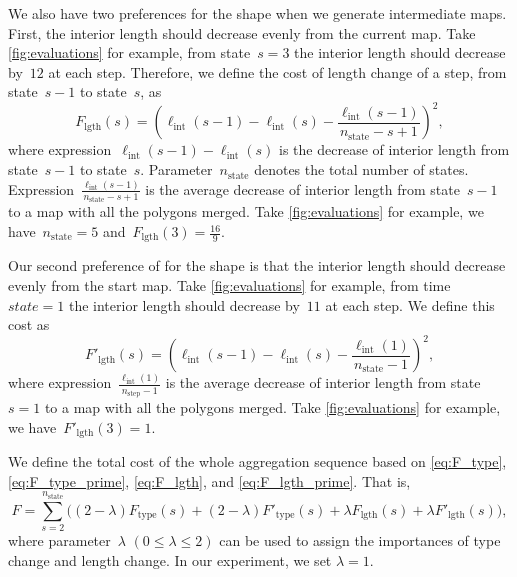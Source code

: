 \documentclass[ijgi,article,submit,moreauthors,pdftex]{Definitions/mdpi}
\begin{document}
We also have two preferences for the shape when we generate intermediate maps.
First, the interior length should decrease evenly from the current map.
Take \fig\ref{fig:evaluations} for example, 
from state~$s=3$ the interior length should decrease by~$12$ at each step.
Therefore, we define the cost of length change of a step,
from state~$s-1$ to state~$s$, as
\begin{equation}
\label{eq:F_lgth}
F_\mathrm{lgth}(s)=
    \left(\ell_\mathrm{int}(s-1)-\ell_\mathrm{int}(s)-
        \frac{\ell_\mathrm{int}(s-1)}{n_\mathrm{state}-s+1}\right)^2,
\end{equation}
where expression~$\ell_\mathrm{int}(s-1)-\ell_\mathrm{int}(s)$ 
is the decrease of interior length from state~$s-1$ to state~$s$.
Parameter~$n_\mathrm{state}$ denotes the total number of states.
Expression~$\frac{\ell_\mathrm{int}(s-1)}{n_\mathrm{state}-s+1}$
is the average decrease of interior length from state~$s-1$ 
to a map with all the polygons merged.
Take \fig\ref{fig:evaluations} for example,
we have~$n_\mathrm{state}=5$ and~$F_\mathrm{lgth}(3)=\frac{16}{9}$.


Our second preference of for the shape is that
the interior length should decrease evenly from the start map. 
Take \fig\ref{fig:evaluations} for example, 
from time~$state=1$ the interior length should decrease by~$11$ at each step.
We define this cost as
\begin{equation}
\label{eq:F_lgth_prime}
F'_\mathrm{lgth}(s)=
\left(\ell_\mathrm{int}(s-1)-\ell_\mathrm{int}(s)-
        \frac{\ell_\mathrm{int}(1)}{n_\mathrm{state}-1}\right)^2,
\end{equation}
where expression~$\frac{\ell_\mathrm{int}(1)}{n_\mathrm{step}-1}$
is the average decrease of interior length from state~$s=1$ 
to a map with all the polygons merged.
Take \fig\ref{fig:evaluations} for example,
we have~$F'_\mathrm{lgth}(3)=1$.

We define the total cost of the whole aggregation sequence
based on \eqs\ref{eq:F_type}, \ref{eq:F_type_prime}, 
\ref{eq:F_lgth}, and \ref{eq:F_lgth_prime}. 
That is,
\begin{equation}
\label{eq:F}
F = \sum_{s=2}^{n_\mathrm{state}}
        \bigg(
            (2-\lambda)F_\mathrm{type}(s) +
            (2-\lambda)F'_\mathrm{type}(s) + 
            \lambda F_\mathrm{lgth}(s) +
            \lambda F'_\mathrm{lgth}(s)
        \bigg),
\end{equation}
where parameter~$\lambda$ $(0\le \lambda \le 2)$ can be used to assign the importances of 
type change and length change.
In our experiment, we set $\lambda=1$.
\end{document}
